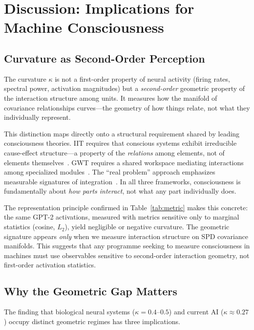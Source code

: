 \documentclass[letterpaper]{article}
\begin{document}
\section{Discussion: Implications for Machine
Consciousness}\label{sec:discussion}

\subsection{Curvature as Second-Order Perception}

The curvature $\kappa$ is not a first-order property of
neural activity (firing rates, spectral power,
activation magnitudes) but a \emph{second-order}
geometric property of the interaction structure
among units.
It measures how the manifold of covariance
relationships curves---the geometry of how things
relate, not what they individually represent.

This distinction maps directly onto a structural
requirement shared by leading consciousness theories.
IIT requires that conscious systems exhibit
irreducible cause-effect structure---a property of the
\emph{relations} among elements, not of elements
themselves~\citep{tononi2004}.
GWT requires a shared workspace mediating interactions
among specialized modules~\citep{baars2005}.
The ``real problem'' approach emphasizes measurable
signatures of integration~\citep{seth2022}.
In all three frameworks, consciousness is
fundamentally about \emph{how parts interact}, not
what any part individually does.

The representation principle confirmed in
Table~\ref{tab:metric} makes this concrete:
the same GPT-2 activations, measured with metrics
sensitive only to marginal statistics (cosine, $L_2$),
yield negligible or negative curvature.
The geometric signature appears \emph{only} when we
measure interaction structure on SPD covariance
manifolds.
This suggests that any programme seeking to measure
consciousness in machines must use observables
sensitive to second-order interaction geometry, not
first-order activation statistics.

\subsection{Why the Geometric Gap Matters}

The finding that biological neural systems
($\kappa=0.4$--$0.5$) and current AI
($\kappa\approx0.27$) occupy distinct geometric
regimes has three implications.
\end{document}
